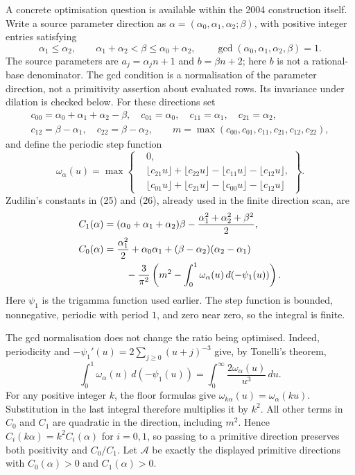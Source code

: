 A concrete optimisation question is available within the 2004
construction itself. Write a source parameter direction as
$\alpha=(\alpha_0,\alpha_1,\alpha_2;\beta)$, with positive integer entries satisfying
\[
 \alpha_1\le\alpha_2,\qquad
 \alpha_1+\alpha_2<\beta\le\alpha_0+\alpha_2,\qquad
 \gcd(\alpha_0,\alpha_1,\alpha_2,\beta)=1.
\]
The source parameters are $a_j=\alpha_jn+1$ and $b=\beta n+2$;
here $b$ is not a rational-base denominator. The gcd condition is a
normalisation of the parameter direction, not a primitivity assertion
about evaluated rows. Its invariance under dilation is checked below.
For these directions set
\[
 \begin{gathered}
 c_{00}=\alpha_0+\alpha_1+\alpha_2-\beta,\quad
 c_{01}=\alpha_0,\quad c_{11}=\alpha_1,\quad c_{21}=\alpha_2,\\
 c_{12}=\beta-\alpha_1,\quad c_{22}=\beta-\alpha_2,\qquad
 m=\max(c_{00},c_{01},c_{11},c_{21},c_{12},c_{22}),
 \end{gathered}
\]
and define the periodic step function
\[
 \omega_\alpha(u)=\max\left\{\begin{aligned}
 &0,\\[-2pt]
 &\lfloor c_{21}u\rfloor+\lfloor c_{22}u\rfloor
       -\lfloor c_{11}u\rfloor-\lfloor c_{12}u\rfloor,\\[-2pt]
 &\lfloor c_{01}u\rfloor+\lfloor c_{21}u\rfloor
       -\lfloor c_{00}u\rfloor-\lfloor c_{12}u\rfloor
 \end{aligned}\right\}.
\]
Zudilin's constants in (25) and (26), already used in the finite
direction scan, are
\[
 \begin{aligned}
 C_1(\alpha)&=(\alpha_0+\alpha_1+\alpha_2)\beta
               -\frac{\alpha_1^2+\alpha_2^2+\beta^2}{2},\\
 C_0(\alpha)&=\frac{\alpha_1^2}{2}+\alpha_0\alpha_1
            +(\beta-\alpha_2)(\alpha_2-\alpha_1)\\
 &\hspace{8mm}-\frac3{\pi^2}
       \left(m^2-\int_0^1\omega_\alpha(u)\,d(-\psi_1(u))\right).
 \end{aligned}
\]
Here $\psi_1$ is the trigamma function used earlier. The step function
is bounded, nonnegative, periodic with period $1$, and zero near zero,
so the integral is finite.

The gcd normalisation does not change the ratio being optimised.
Indeed, periodicity and
$-\psi_1'(u)=2\sum_{j\ge0}(u+j)^{-3}$ give, by Tonelli's theorem,
\[
 \int_0^1\omega_\alpha(u)\,d(-\psi_1(u))
   =\int_0^\infty\frac{2\omega_\alpha(u)}{u^3}\,du.
\]
For any positive integer $k$, the floor formulas give
$\omega_{k\alpha}(u)=\omega_\alpha(ku)$. Substitution in the last integral
therefore multiplies it by $k^2$. All other terms in $C_0$ and $C_1$
are quadratic in the direction, including $m^2$. Hence
$C_i(k\alpha)=k^2C_i(\alpha)$ for $i=0,1$, so passing to a primitive
direction preserves both positivity and $C_0/C_1$.
Let $\mathcal A$ be exactly the displayed primitive directions with
$C_0(\alpha)>0$ and $C_1(\alpha)>0$.

